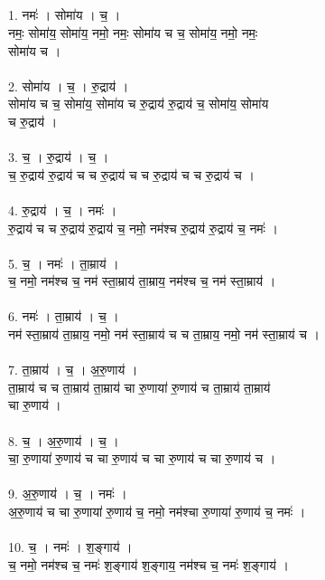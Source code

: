 \subsection{}
1. नमः॑ । सोमा॑य । च॒ ।\\
नमः॒ सोमा॑य॒ सोमा॑य॒ नमो॒ नमः॒ सोमा॑य च च॒ सोमा॑य॒ नमो॒ नमः॒\\
सोमा॑य च ।\\
\\
2. सोमा॑य । च॒ । रु॒द्राय॑ ।\\
सोमा॑य च च॒ सोमा॑य॒ सोमा॑य च रु॒द्राय॑ रु॒द्राय॑ च॒ सोमा॑य॒ सोमा॑य\\
च रु॒द्राय॑ ।\\
\\
3. च॒ । रु॒द्राय॑ । च॒ ।\\
च॒ रु॒द्राय॑ रु॒द्राय॑ च च रु॒द्राय॑ च च रु॒द्राय॑ च च रु॒द्राय॑ च ।\\
\\
4. रु॒द्राय॑ । च॒ । नमः॑ ।\\
रु॒द्राय॑ च च रु॒द्राय॑ रु॒द्राय॑ च॒ नमो॒ नम॑श्च रु॒द्राय॑ रु॒द्राय॑ च॒ नमः॑ ।\\
\\
5. च॒ । नमः॑ । ता॒म्राय॑ ।\\
च॒ नमो॒ नम॑श्च च॒ नम॑ स्ता॒म्राय॑ ता॒म्राय॒ नम॑श्च च॒ नम॑ स्ता॒म्राय॑ ।\\
\\
6. नमः॑ । ता॒म्राय॑ । च॒ ।\\
नम॑ स्ता॒म्राय॑ ता॒म्राय॒ नमो॒ नम॑ स्ता॒म्राय॑ च च ता॒म्राय॒ नमो॒ नम॑ स्ता॒म्राय॑ च ।\\
\\
7. ता॒म्राय॑ । च॒ । अ॒रु॒णाय॑ ।\\
ता॒म्राय॑ च च ता॒म्राय॑ ता॒म्राय॑ चा रु॒णाया॑ रु॒णाय॑ च ता॒म्राय॑ ता॒म्राय॑\\
चा रु॒णाय॑ ।\\
\\
8. च॒ । अ॒रु॒णाय॑ । च॒ ।\\
चा॒ रु॒णाया॑ रु॒णाय॑ च चा रु॒णाय॑ च चा रु॒णाय॑ च चा रु॒णाय॑ च ।\\
\\
9. अ॒रु॒णाय॑ । च॒ । नमः॑ ।\\
अ॒रु॒णाय॑ च चा रु॒णाया॑ रु॒णाय॑ च॒ नमो॒ नम॑श्चा रु॒णाया॑ रु॒णाय॑ च॒ नमः॑ ।\\
\\
10. च॒ । नमः॑ । श॒ङ्गाय॑ ।\\
च॒ नमो॒ नम॑श्च च॒ नमः॑ श॒ङ्गाय॑ श॒ङ्गाय॒ नम॑श्च च॒ नमः॑ श॒ङ्गाय॑ ।\\
\\

